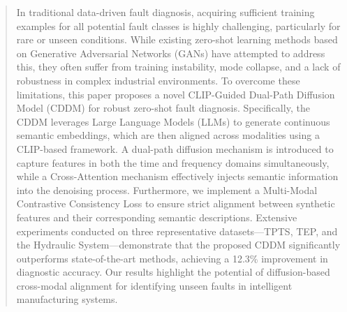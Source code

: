 \begin{abstract}
In traditional data-driven fault diagnosis, acquiring sufficient training examples for all potential fault classes is highly challenging, particularly for rare or unseen conditions. While existing zero-shot learning methods based on Generative Adversarial Networks (GANs) have attempted to address this, they often suffer from training instability, mode collapse, and a lack of robustness in complex industrial environments. To overcome these limitations, this paper proposes a novel CLIP-Guided Dual-Path Diffusion Model (CDDM) for robust zero-shot fault diagnosis. Specifically, the CDDM leverages Large Language Models (LLMs) to generate continuous semantic embeddings, which are then aligned across modalities using a CLIP-based framework. A dual-path diffusion mechanism is introduced to capture features in both the time and frequency domains simultaneously, while a Cross-Attention mechanism effectively injects semantic information into the denoising process. Furthermore, we implement a Multi-Modal Contrastive Consistency Loss to ensure strict alignment between synthetic features and their corresponding semantic descriptions. Extensive experiments conducted on three representative datasets—TPTS, TEP, and the Hydraulic System—demonstrate that the proposed CDDM significantly outperforms state-of-the-art methods, achieving a 12.3\% improvement in diagnostic accuracy. Our results highlight the potential of diffusion-based cross-modal alignment for identifying unseen faults in intelligent manufacturing systems.
\end{abstract}


